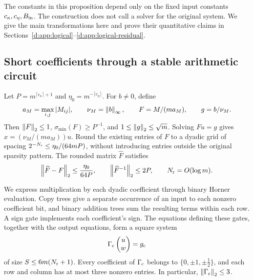 The constants in this proposition depend only on the fixed input constants $c_\kappa,c_\eta,B_{\rm in}$.
The construction does not call a solver for the original system. We give
the main transformations here and prove their quantitative claims in
Sections~\ref{d:app:logical}--\ref{d:app:logical-residual}.

\subsection{Short coefficients through a stable arithmetic circuit}

Let $P=m^{\lceil c_\kappa\rceil+1}$ and
$\eta_0=m^{-\lceil c_\eta\rceil}$. For $b\ne0$, define
\begin{equation}
 a_M=\max_{i,j}|M_{ij}|,\qquad \nu_M=\left\lVert b\right\rVert_\infty,
 \qquad F=M/(ma_M),\qquad g=b/\nu_M.
 \label{d:eq:logical-normalization}
\end{equation}
Then $\left\lVert F\right\rVert_2\le1$, $\sigma_{\min}(F)\ge P^{-1}$, and
$1\le\left\lVert g\right\rVert_2\le\sqrt m$. Solving $Fu=g$ gives
$x=(\nu_M/(ma_M))u$. Round the existing entries of $F$ to a dyadic grid
of spacing $2^{-N_{\rm r}}\le\eta_0/(64mP)$, without introducing entries outside
the original sparsity pattern. The rounded matrix $\widehat F$ satisfies
\begin{equation}
 \left\lVert \widehat F-F\right\rVert_2\le \frac{\eta_0}{64P},
 \qquad \left\lVert \widehat F^{-1}\right\rVert_2\le2P,
 \qquad N_{\rm r}=O(\log m).
 \label{d:eq:logical-rounding}
\end{equation}

We express multiplication by each dyadic coefficient through binary
Horner evaluation. Copy trees give a separate occurrence of an input to
each nonzero coefficient bit, and binary addition trees sum the resulting
terms within each row. A sign gate implements each coefficient's sign.
The equations defining these gates, together with the output equations,
form a square system
\begin{equation}
 \Gamma_{\rm c}\begin{pmatrix}u\\w\end{pmatrix}=g_{\rm c}
 \label{d:eq:logical-circuit}
\end{equation}
of size $S\le6m(N_{\rm r}+1)$. Every coefficient of $\Gamma_{\rm c}$ belongs to
$\{0,\pm1,\pm\tfrac12\}$, and each row and column has at most three
nonzero entries. In particular, $\left\lVert \Gamma_{\rm c}\right\rVert_2\le3$.

